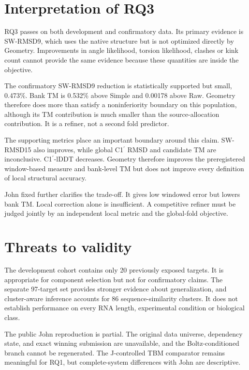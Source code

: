 \documentclass[12pt,a4paper,oneside]{report}
\newcommand{\cprime}{C1$^{\prime}$}
\begin{document}
\section{Interpretation of RQ3}

RQ3 passes on both development and confirmatory data. Its primary evidence is
SW-RMSD9, which uses the native structure but is not optimized directly by Geometry.
Improvements in angle likelihood, torsion likelihood, clashes or kink count cannot
provide the same evidence because these quantities are inside the objective.

The confirmatory SW-RMSD9 reduction is statistically supported but small, 0.473\%.
Bank TM is 0.532\% above Simple and 0.00178 above Raw. Geometry therefore does more
than satisfy a noninferiority boundary on this population, although its TM contribution
is much smaller than the source-allocation contribution. It is a refiner, not a second
fold predictor.

The supporting metrics place an important boundary around this claim. SW-RMSD15 also
improves, while global \cprime{} RMSD and candidate TM are inconclusive. \cprime{}-lDDT
decreases. Geometry therefore improves the preregistered window-based measure and
bank-level TM but does not improve every definition of local structural accuracy.

John fixed further clarifies the trade-off. It gives low windowed error but lowers
bank TM. Local correction alone is insufficient. A competitive refiner must be judged
jointly by an independent local metric and the global-fold objective.

\section{Threats to validity}

The development cohort contains only 20 previously exposed targets. It is appropriate
for component selection but not for confirmatory claims. The separate 97-target set
provides stronger evidence about generalization, and cluster-aware inference accounts
for 86 sequence-similarity clusters. It does not establish performance on every RNA
length, experimental condition or biological class.

The public John reproduction is partial. The original data universe, dependency state,
and exact winning submission are unavailable, and the Boltz-conditioned branch cannot
be regenerated. The J-controlled TBM comparator remains meaningful for RQ1, but
complete-system differences with John are descriptive.
\end{document}
